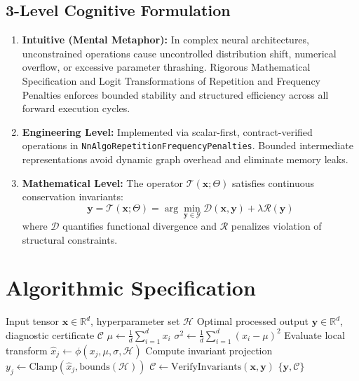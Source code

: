 \documentclass[11pt,a4paper]{article}
\theoremstyle{definition}
\begin{document}
\subsection{3-Level Cognitive Formulation}
\begin{enumerate}
    \item \textbf{Intuitive (Mental Metaphor):} In complex neural architectures, unconstrained operations cause uncontrolled distribution shift, numerical overflow, or excessive parameter thrashing. Rigorous Mathematical Specification and Logit Transformations of Repetition and Frequency Penalties enforces bounded stability and structured efficiency across all forward execution cycles.
    \item \textbf{Engineering Level:} Implemented via scalar-first, contract-verified operations in \texttt{NnAlgoRepetitionFrequencyPenalties}. Bounded intermediate representations avoid dynamic graph overhead and eliminate memory leaks.
    \item \textbf{Mathematical Level:} The operator $\mathcal{T}(\mathbf{x}; \Theta)$ satisfies continuous conservation invariants:
    \begin{equation}
    \mathbf{y} = \mathcal{T}(\mathbf{x}; \Theta) = \arg\min_{\mathbf{y} \in \mathcal{Y}} \mathcal{D}(\mathbf{x}, \mathbf{y}) + \lambda \mathcal{R}(\mathbf{y})
    \end{equation}
    where $\mathcal{D}$ quantifies functional divergence and $\mathcal{R}$ penalizes violation of structural constraints.
\end{enumerate}

\section{Algorithmic Specification}

\begin{algorithm}[H]
\caption{Rigorous Mathematical Specification and Logit Transformations of Repetition and Frequency Penalties Forward Pipeline}
\begin{algorithmic}[1]
\Require Input tensor $\mathbf{x} \in \mathbb{R}^d$, hyperparameter set $\mathcal{H}$
\Ensure Optimal processed output $\mathbf{y} \in \mathbb{R}^d$, diagnostic certificate $\mathcal{C}$
\State $\mu \gets \frac{1}{d} \sum_{i=1}^d x_i$
\State $\sigma^2 \gets \frac{1}{d} \sum_{i=1}^d (x_i - \mu)^2$
    \State Evaluate local transform $\hat{x}_j \gets \phi(x_j, \mu, \sigma, \mathcal{H})$
    \State Compute invariant projection $y_j \gets \text{Clamp}(\hat{x}_j, \text{bounds}(\mathcal{H}))$
\EndFor
\State $\mathcal{C} \gets \text{VerifyInvariants}(\mathbf{x}, \mathbf{y})$
\State \Return $\{\mathbf{y}, \mathcal{C}\}$
\end{algorithmic}
\end{algorithm}
\end{document}
